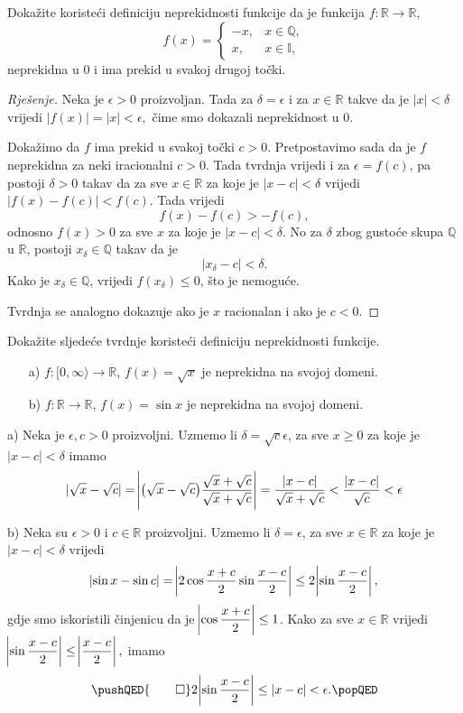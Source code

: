 \begin{exercise}
Dokažite koristeći definiciju neprekidnosti funkcije da je funkcija $f : \mathbb{R}\to\mathbb{R}$,
$$f(x)=\begin{cases}
-x, & x\in \mathbb{Q},\\
x, & x\in \mathbb{I},
\end{cases}$$
neprekidna u $0$ i ima prekid u svakoj drugoj točki.
\end{exercise}
\newpage
\begin{proof}[Rješenje]
Neka je $\epsilon>0$ proizvoljan. Tada za $\delta=\epsilon$ i za $x\in \mathbb{R}$ takve da je $|x|<\delta$ vrijedi $|f(x)|=|x|<\epsilon,$ čime smo dokazali neprekidnost u $0$.

Dokažimo da $f$ ima prekid u svakoj točki $c>0$. Pretpostavimo sada da je $f$ neprekidna za neki iracionalni $c>0$. Tada tvrdnja vrijedi i za $\epsilon=f(c)$, pa postoji $\delta>0$ takav da za sve $x\in \mathbb{R}$ za koje je $|x-c|<\delta$ vrijedi $|f(x)-f(c)|<f(c)$. Tada vrijedi $$f(x)-f(c)>-f(c),$$ odnosno $f(x)>0$ za sve $x$ za koje je $|x-c|<\delta$. No za $\delta$ zbog gustoće skupa $\mathbb{Q}$ u $\mathbb{R}$, postoji $x_\delta\in \mathbb{Q}$ takav da je $$|x_\delta-c|<\delta.$$ Kako je $x_\delta\in \mathbb{Q}$, vrijedi $f(x_\delta)\leq 0$, što je nemoguće. 

Tvrdnja se analogno dokazuje ako je $x$ racionalan i ako je $c<0$.
\end{proof}
\begin{exercise}
\label{cont4}
Dokažite sljedeće tvrdnje koristeći definiciju neprekidnosti funkcije. 
\begin{itemize}
\item[a)] $f : [0,\infty \rangle\to \mathbb{R}$, $f(x)=\sqrt{x}$ je neprekidna na svojoj domeni.
\item[b)] $f : \mathbb{R} \to \mathbb{R}$, $f(x)=\sin{x}$ je neprekidna na svojoj domeni.
\end{itemize}
\end{exercise}
\begin{proof*}
a) Neka je $\epsilon, c>0$ proizvoljni. Uzmemo li $\delta=\sqrt{c}\epsilon$, za sve $x\geq 0$ za koje je $|x-c|<\delta$ imamo
$$|\sqrt{x}-\sqrt{c}|=\abs{\left(\sqrt{x}-\sqrt{c}\right)\dfrac{\sqrt{x}+\sqrt{c}}{\sqrt{x}+\sqrt{c}}}=\dfrac{|x-c|}{\sqrt{x}+\sqrt{c}}<\dfrac{|x-c|}{\sqrt{c}}<\epsilon$$

b) Neka su $\epsilon>0$ i $c\in \mathbb{R}$ proizvoljni. Uzmemo li $\delta=\epsilon$, za sve $x\in \mathbb{R}$ za koje je $|x-c|<\delta$ vrijedi
$$\abs{\sin{x}-\sin{c}}=\abs{2\cos{\dfrac{x+c}{2}}\sin{\dfrac{x-c}{2}}}\leq 2\abs{\sin{\dfrac{x-c}{2}}},$$
gdje smo iskoristili činjenicu da je $\abs{\cos{\dfrac{x+c}{2}}}\leq 1$. Kako za sve $x\in \mathbb{R}$ vrijedi $\abs{\sin{\dfrac{x-c}{2}}}\leq \abs{\dfrac{x-c}{2}},$ imamo
\[
\pushQED{\qed}
2\abs{\sin{\dfrac{x-c}{2}}}\leq |x-c|<\epsilon.\qedhere
\popQED
\]
\end{proof*}

